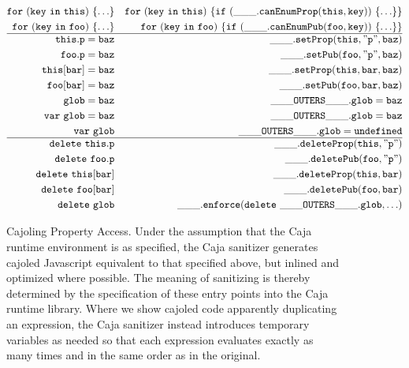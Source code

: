 \documentclass[letterpaper,twocolumn,10pt]{article}
\newcommand{\code}[1]{{\tt {#1}}}              %
\begin{document}
\begin{figure}
\begin{eqnarray}
  \code{for\ (key\ in\ this)\ \{\ldots\}} & \label{for:internal}
                                 & \code{for\ (key\ in\ this)\ \{if\ (\_\_\_.canEnumProp(this,key))\ \{\ldots\}\}}\\
  \code{for\ (key\ in\ foo)\ \{\ldots\}}  & \label{for:public}
                                 & \code{for\ (key\ in\ foo)\ \{if\ (\_\_\_.canEnumPub(foo,key))\ \{\ldots\}\}} \\
  \hline
  \code{this.p = baz}       & \label{set:internal}      & \code{\_\_\_.setProp(this,"p",baz)} \\
  \code{foo.p = baz}        & \label{set:public}        & \code{\_\_\_.setPub(foo,"p",baz)} \\
  \code{this[bar] = baz}    & \label{set:index-internal} & \code{\_\_\_.setProp(this,bar,baz)} \\
  \code{foo[bar] = baz}     & \label{set:index-public}  & \code{\_\_\_.setPub(foo,bar,baz)} \\
  \code{glob = baz}         & \label{set:global}        & \code{\_\_\_OUTERS\_\_\_.glob = baz} \\
  \code{var\ glob = baz}    & \label{set:global-init}   & \code{\_\_\_OUTERS\_\_\_.glob = baz} \\
  \code{var\ glob}          & \label{set:global-decl}   & \code{\_\_\_OUTERS\_\_\_.glob = undefined} \\
  \hline
  \code{delete\ this.p}     & \label{delete-internal}   & \code{\_\_\_.deleteProp(this,"p")} \\
  \code{delete\ foo.p}      & \label{delete:public}     & \code{\_\_\_.deletePub(foo,"p")} \\
  \code{delete\ this[bar]}  & \label{delete:index-internal} & \code{\_\_\_.deleteProp(this,bar)} \\
 \code{delete\ foo[bar]}    & \label{delete:index-public}   & \code{\_\_\_.deletePub(foo,bar)} \\
  \code{delete\ glob}       & \label{delete:global}   & \code{\_\_\_.enforce(delete\ \_\_\_OUTERS\_\_\_.glob,\ldots)}
\end{eqnarray}

\caption[Cajoling Property Access]{Cajoling Property Access. Under the 
assumption that the Caja runtime environment is as specified, the Caja 
sanitizer generates cajoled Javascript equivalent to that specified above, 
but inlined and optimized where possible. The meaning of sanitizing is 
thereby determined by the specification of these entry points into the Caja 
runtime library. Where we show cajoled code apparently duplicating an 
expression, the Caja sanitizer instead introduces temporary variables as 
needed so that each expression evaluates exactly as many times and in the 
same order as in the original.}
\label{tab:prop-xlate}
\end{figure}
\end{document}
